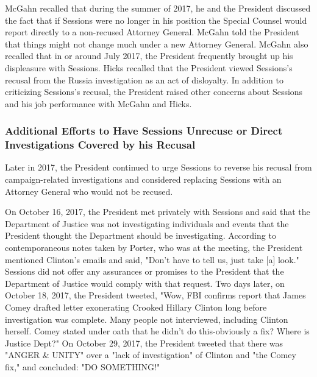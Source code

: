 McGahn recalled that during the summer of 2017, he and the President discussed the fact that if Sessions were no longer in his position the Special Counsel would report directly to a non-recused Attorney General.%
McGahn told the President that things might not change much under a new Attorney General.%
McGahn also recalled that in or around July 2017, the President frequently brought up his displeasure with Sessions.%
Hicks recalled that the President viewed Sessions's recusal from the Russia investigation as an act of disloyalty.%
In addition to criticizing Sessions's recusal, the President raised other concerns about Sessions and his job performance with McGahn and Hicks.%

\subsubsection{Additional Efforts to Have Sessions Unrecuse or Direct Investigations Covered by his Recusal}

Later in 2017, the President continued to urge Sessions to reverse his recusal from campaign-related investigations and considered replacing Sessions with an Attorney General who would not be recused.

On October 16, 2017, the President met privately with Sessions and said that the Department of Justice was not investigating individuals and events that the President thought the Department should be investigating.%
According to contemporaneous notes taken by Porter, who was at the meeting, the President mentioned Clinton's emails and said, "Don't have to tell us, just take [a] look."%
Sessions did not offer any assurances or promises to the President that the Department of Justice would comply with that request.%
Two days later, on October 18, 2017, the President tweeted, "Wow, FBI confirms report that James Comey drafted letter exonerating Crooked Hillary Clinton long before investigation was complete.
Many people not interviewed, including Clinton herself.
Comey stated under oath that he didn't do this-obviously a fix?
Where is Justice Dept?"%
On October 29, 2017, the President tweeted that there was "ANGER \& UNITY" over a "lack of investigation" of Clinton and "the Comey fix," and concluded: "DO SOMETHING!"%


